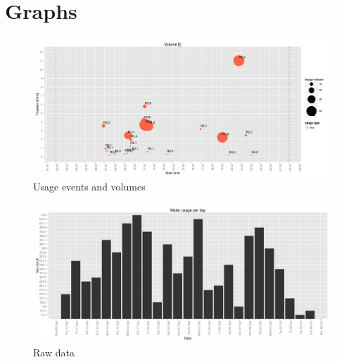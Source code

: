 \documentclass{article}\usepackage[]{graphicx}\usepackage[]{color}
\makeatletter
\def\maxwidth{ %
  \ifdim\Gin@nat@width>\linewidth
    \linewidth
  \else
    \Gin@nat@width
  \fi
}
\newenvironment{knitrout}{}{} %
\makeatother
\begin{document}
\newpage

\section{Graphs}
\begin{knitrout}
\color{fgcolor}\begin{figure}[h!]

{\centering \includegraphics[width=\maxwidth]{figure/balloon-1} 

}

\caption[Usage events and volumes]{Usage events and volumes}\label{fig:balloon}
\end{figure}


\end{knitrout}

\begin{knitrout}
\color{fgcolor}\begin{figure}[h!]
\includegraphics[width=\maxwidth]{figure/raw-1} \caption[Raw data]{Raw data}\label{fig:raw}
\end{figure}


\end{knitrout}
\end{document}
